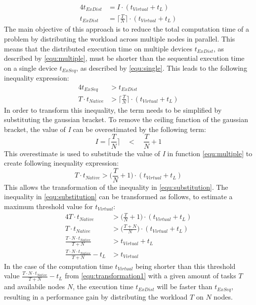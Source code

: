 \begin{alignat}{4}
  t_{ExDist} &= I \cdot (t_{Virtual} + t_{L}) \nonumber \\
  t_{ExDist} &= \bigg\lceil\frac{T}{N}\bigg\rceil \cdot (t_{Virtual} + t_{L})
  \label{equ:multiple}
\end{alignat}
The main objective of this approach is to reduce the total computation time of a problem by distributing the workload across multiple nodes in parallel. This means that the distributed execution time on multiple devices $t_{ExDist}$, as described by \eqref{equ:multiple}, must be shorter than the sequential execution time on a single device $t_{ExSeq}$, as described by \eqref{equ:single}. This leads to the following inequality expression:
\begin{alignat}{4}
  t_{ExSeq} &> t_{ExDist} \nonumber \\
  T \cdot t_{Native} &> \bigg\lceil\frac{T}{N}\bigg\rceil \cdot (t_{Virtual} + t_{L})
  \label{equ:compare}
\end{alignat}
In order to transform this inequality, the term needs to be simplified by substituting the gaussian bracket. To remove the ceiling function of the gaussian bracket, the value of \emph{I} can be overestimated by the following term:
\begin{equation}
  I = \bigg\lceil\frac{T}{N}\bigg\rceil \quad < \quad \frac{T}{N} + 1
  \label{equ:frac2}
\end{equation}
This overestimate is used to substitude the value of \emph{I} in function \eqref{equ:multiple} to create following inequality expression:
\begin{equation}
  T \cdot t_{Native} > \bigg(\frac{T}{N} + 1\bigg) \cdot (t_{Virtual} + t_{L})
  \label{equ:substitution}
\end{equation}
This allows the transformation of the inequality in \eqref{equ:substitution}. The inequality in \eqref{equ:substitution} can be transformed as follows, to estimate a maximum threshold value for $t_{Virtual}$:
\begin{alignat}{4}
  T \cdot t_{Native} &> \bigg(\frac{T}{N} + 1\bigg) \cdot (t_{Virtual} + t_{L}) \nonumber \\
  T \cdot t_{Native} &> \bigg(\frac{T + N}{N}\bigg) \cdot (t_{Virtual} + t_{L}) \nonumber \\
  \frac{T \cdot N \cdot t_{Native}}{T + N} &> t_{Virtual} + t_{L} \nonumber \\
  \frac{T \cdot N \cdot t_{Native}}{T + N} - t_{L} &> t_{Virtual}
  \label{equ:transformation1}
\end{alignat}
In the case of the computation time $t_{Virtual}$ being shorter than this threshold value $\frac{T \cdot N \cdot t_{Native}}{T + N} - t_{L}$ from \eqref{equ:transformation1} with a given amount of tasks $T$ and availabile nodes $N$, the execution time $t_{ExDist}$ will be faster than $t_{ExSeq}$, resulting in a performance gain by distributing the workload $T$ on $N$ nodes.

